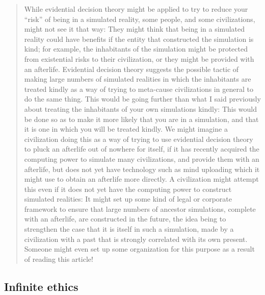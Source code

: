 \begin{quote}
While evidential decision theory might be applied to try to reduce your
``risk'' of being in a simulated reality, some people, and some
civilizations, might not see it that way: They might think that being in
a simulated reality could have benefits if the entity that constructed
the simulation is kind; for example, the inhabitants of the simulation
might be protected from existential risks to their civilization, or they
might be provided with an afterlife. Evidential decision theory suggests
the possible tactic of making large numbers of simulated realities in
which the inhabitants are treated kindly as a way of trying to
meta-cause civilizations in general to do the same thing. This would be
going further than what I said previously about treating the inhabitants
of your own simulations kindly: This would be done so as to make it more
likely that you are in a simulation, and that it is one in which you
will be treated kindly. We might imagine a civilization doing this as a
way of trying to use evidential decision theory to pluck an afterlife
out of nowhere for itself, if it has recently acquired the computing
power to simulate many civilizations, and provide them with an
afterlife, but does not yet have technology such as mind uploading which
it might use to obtain an afterlife more directly. A civilization might
attempt this even if it does not yet have the computing power to
construct simulated realities: It might set up some kind of legal or
corporate framework to ensure that large numbers of ancestor
simulations, complete with an afterlife, are constructed in the future,
the idea being to strengthen the case that it is itself in such a
simulation, made by a civilization with a past that is strongly
correlated with its own present. Someone might even set up some
organization for this purpose as a result of reading this article!
\end{quote}

\hypertarget{infinite-ethics}{\subsection{Infinite
ethics}\label{infinite-ethics}}

